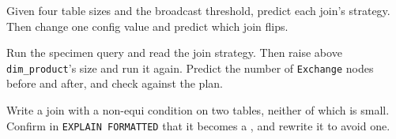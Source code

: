 \exercisehead
\begin{exercises}
\item Given four table sizes and the broadcast threshold, predict each join's
      strategy. Then change one config value and predict which join flips.
\item Run the specimen query and read the join strategy. Then raise
       above \texttt{dim\_product}'s
      size and run it again. Predict the number of \texttt{Exchange} nodes
      before and after, and check against the plan.
\item Write a join with a non-equi condition on two tables, neither of which is
      small. Confirm in \texttt{EXPLAIN FORMATTED} that it becomes a
      , and rewrite it to avoid one.
\end{exercises}
